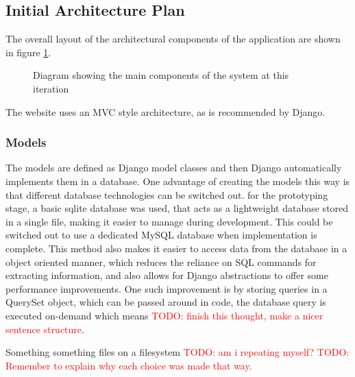 \documentclass[a4paper,11pt]{report}
\newcommand{\todo}[1]{\textcolor{red}{TODO: #1}}
\begin{document}
\subsection{Initial Architecture Plan}
The overall layout of the architectural components of the application are shown in figure \ref{fig:sysd}. 
\begin{figure}[ht]
	\centering
	\caption{Diagram showing the main components of the system at this iteration}
	\label{fig:sysd}
\end{figure}
The website uses an MVC style architecture, as is recommended by Django.
\subsubsection{Models}
The models are defined as Django model classes and then Django automatically implements them in a database. One advantage of creating the models this way is that different database technologies can be switched out. for the prototyping stage, a basic sqlite database was used, that acts as a lightweight database stored in a single file, making it easier to manage during development. This could be switched out to use a dedicated MySQL database when implementation is complete. This method also makes it easier to access data from the database in a object oriented manner, which reduces the reliance on SQL commands for extracting information, and also allows for Django abstractions to offer some performance improvements. One such improvement is by storing queries in a QuerySet object, which can be passed around in code, the database query is executed on-demand which means \todo{finish this thought, make a nicer sentence structure}.\par
Something something files on a filesystem \todo{am i repeating myself?}
\todo{Remember to explain why each choice was made that way.}
\end{document}
